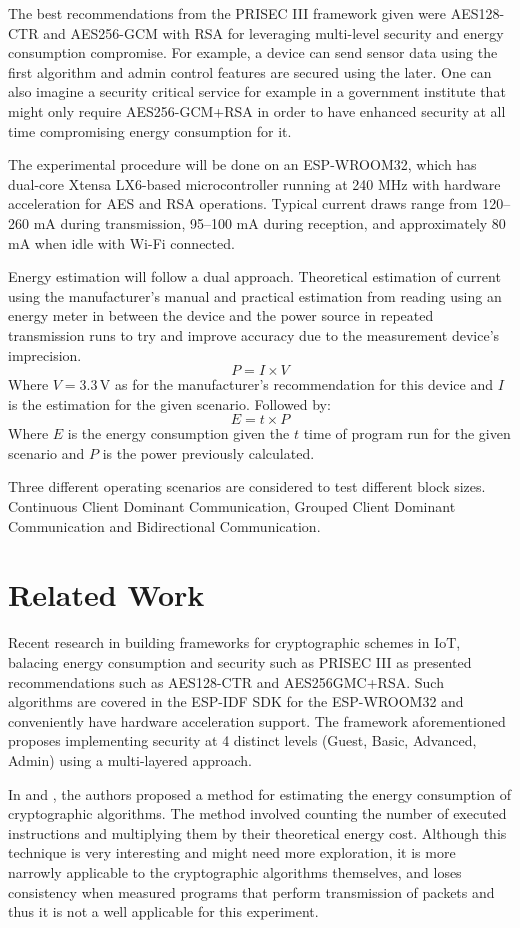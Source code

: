 \documentclass[METI_NISS]{IEEEtran}
\begin{document}
The best recommendations from the PRISEC III framework given were AES128-CTR and AES256-GCM with RSA for leveraging multi-level security and energy consumption compromise. For example, a device can send sensor data using the first algorithm and admin control features are secured using the later. One can also imagine a security critical service for example in a government institute that might only require AES256-GCM+RSA in order to have enhanced security at all time compromising energy consumption for it.

The experimental procedure will be done on an ESP-WROOM32, which has dual-core Xtensa LX6-based microcontroller running at 240 MHz with hardware acceleration for AES and RSA operations. Typical current draws range from 120–260 mA during transmission, 95–100 mA during reception, and approximately 80 mA when idle with Wi-Fi connected.

Energy estimation will follow a dual approach. Theoretical estimation of current using the manufacturer's manual\cite{esp32manual} and practical estimation from reading using an energy meter in between the device and the power source in repeated transmission runs to try and improve accuracy due to the measurement device's imprecision.
\[
P = I \times V
\]
Where \( V = 3.3\,\text{V} \) as for the manufacturer's recommendation for this device and \( I \) is the estimation for the given scenario.
Followed by:
\[
E = t \times P
\]
Where \( E \) is the energy consumption given the \( t \) time of program run for the given scenario and \( P \) is the power previously calculated.

Three different operating scenarios are considered to test different block sizes. Continuous Client Dominant Communication, Grouped Client Dominant Communication and Bidirectional Communication.

\section{Related Work}
Recent research in building frameworks for cryptographic schemes in IoT, balacing energy consumption and security such as PRISEC III\cite{sohail2025} as presented recommendations such as AES128-CTR and AES256GMC+RSA. Such algorithms are covered in the ESP-IDF SDK for the ESP-WROOM32 and conveniently have hardware acceleration support. The framework aforementioned proposes implementing security at 4 distinct levels (Guest, Basic, Advanced, Admin) using a multi-layered approach.

In \cite{guo2021a} and \cite{guo2021b}, the authors proposed a method for estimating the energy consumption of cryptographic algorithms. The method involved counting the number of executed instructions and multiplying them by their theoretical energy cost. Although this technique is very interesting and might need more exploration, it is more narrowly applicable to the cryptographic algorithms themselves, and loses consistency when measured programs that perform transmission of packets and thus it is not a well applicable for this experiment.
\end{document}
